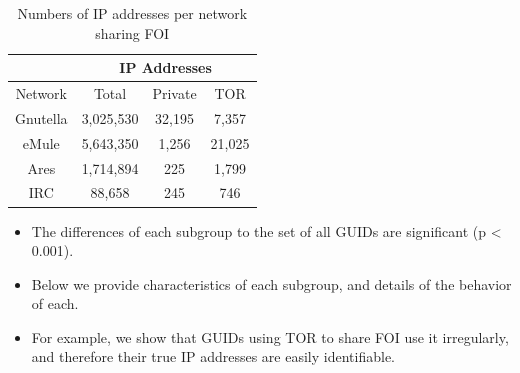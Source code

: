 \documentclass[notes]{beamer}
\begin{document}
\begin{frame}

\begin{block}

\begin{table} 

\centering

\caption{Numbers of IP addresses per network sharing FOI} 
\label{tab:table3}
\begin{tabular}{cccc}\hline & \multicolumn{3}{c}{IP Addresses} \\

\hline 

Network & Total & Private & TOR \\ 

\hline
\hline
Gnutella & 3,025,530 & 32,195 & 7,357 \\
eMule & 5,643,350 & 1,256 & 21,025 \\
Ares & 1,714,894 & 225 & 1,799 \\
IRC & 88,658 & 245 & 746 \\

\hline

\end{tabular}


\end{table}

\end{block}

\end{frame}

\begin{frame}

\begin{itemize}

\item[\checkmark]The differences of each subgroup to the set of all GUIDs are significant (p < 0.001).

\item[\checkmark]Below we provide characteristics of each subgroup, and details of the behavior of each. 

\item[\checkmark]For example, we show that GUIDs using TOR to share FOI use it irregularly, and therefore their true IP addresses are easily identifiable. 

\end{itemize}

\end{frame}
\end{document}
